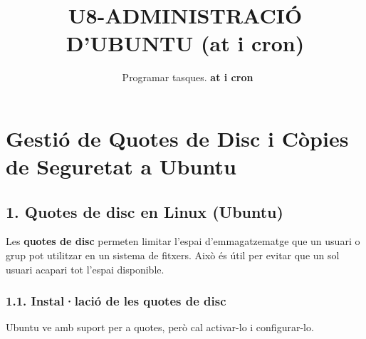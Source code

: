 \documentclass[
  12 pt,
  a4paper,
]{article}
\title{U8-ADMINISTRACIÓ D'UBUNTU (at i cron)}
\subtitle{~Programar tasques. \textbf{at i cron}}
\author{}
\date{\vspace{-2.5em}}
\begin{document}
\maketitle

\section{Gestió de Quotes de Disc i Còpies de Seguretat a
Ubuntu}\label{gestiuxf3-de-quotes-de-disc-i-cuxf2pies-de-seguretat-a-ubuntu}

\subsection{1. Quotes de disc en Linux
(Ubuntu)}\label{quotes-de-disc-en-linux-ubuntu}

Les \textbf{quotes de disc} permeten limitar l'espai d'emmagatzematge
que un usuari o grup pot utilitzar en un sistema de fitxers. Això és
útil per evitar que un sol usuari acapari tot l'espai disponible.

\subsubsection{1.1. Instal·lació de les quotes de
disc}\label{installaciuxf3-de-les-quotes-de-disc}

Ubuntu ve amb suport per a quotes, però cal activar-lo i configurar-lo.
\end{document}

